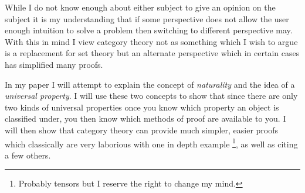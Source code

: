 \documentclass[10pt]{article}
\begin{document}
While I do not know enough about either subject to give an opinion on the subject it is my understanding that if some perspective does not allow the user enough intuition to solve a problem then switching to different perspective may. With this in mind I view category theory not as something which I wish to argue is a replacement for set theory but an alternate perspective which in certain cases has simplified many proofs. 

In my paper I will attempt to explain the concept of \emph{naturality} and the idea of a \emph{universal property}. I will use these two concepts to show that since there are only two kinds of universal properties once you know which property an object is classified under, you then know which methods of proof are available to you. I will then show that category theory can provide much simpler, easier proofs which classically are very laborious with one in depth example \footnote{Probably tensors but I reserve the right to change my mind.}, as well as citing a few others. 
\bigskip


\nocite{*}
\end{document}
